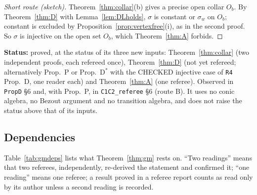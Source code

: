\documentclass[11pt]{article}
\theoremstyle{definition}
\theoremstyle{remark}
\newcommand{\src}[1]{\texttt{#1}}
\newcommand{\status}[1]{\par\smallskip\noindent\textbf{Status:} #1\par\smallskip}
\begin{document}
\begin{proof}[Short route (sketch)]
Theorem~\ref{thm:collar}(b) gives a precise open collar $O_b$. By Theorem~\ref{thm:D} with Lemma~\ref{lem:DLholds}, $\sigma$ is constant or $\sigma_w$ on $O_b$; constant is excluded by Proposition~\ref{prop:vertexfree}(i), as in the second proof. So $\sigma$ is injective on the open set $O_b$, which Theorem~\ref{thm:A} forbids.
\end{proof}
\status{proved, at the status of its three new inputs: Theorem~\ref{thm:collar} (two independent proofs, each refereed once), Theorem~\ref{thm:D} (not yet refereed; alternatively Prop.~P or Prop.~D$^*$ with the CHECKED injective case of \src{R4} Prop.~D, one reader each) and Theorem~\ref{thm:A} (one referee). Observed in \src{PropD} \S6 and, with Prop.~P, in \src{C1C2\_referee} \S6 (route B). It uses no conic algebra, no Bezout argument and no transition algebra, and does not raise the status above that of its inputs.}

\subsection{Dependencies}\label{sec:gm-deps}

Table~\ref{tab:gmdeps} lists what Theorem~\ref{thm:gm} rests on. ``Two readings'' means that two referees, independently, re-derived the statement and confirmed it; ``one reading'' means one referee; a result proved in a referee report counts as read only by its author unless a second reading is recorded.
\end{document}
